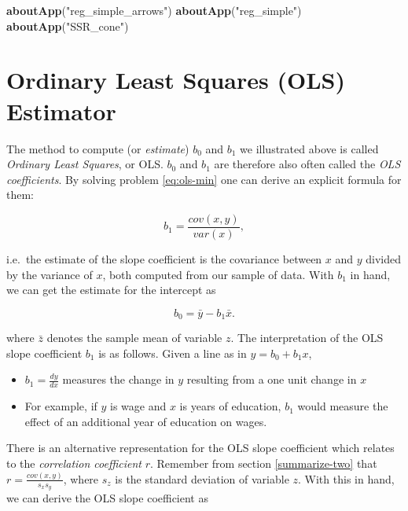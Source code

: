 \documentclass[]{book}
\newenvironment{Shaded}{\begin{snugshade}}{\end{snugshade}}
\newcommand{\KeywordTok}[1]{\textcolor[rgb]{0.13,0.29,0.53}{\textbf{#1}}}
\newcommand{\StringTok}[1]{\textcolor[rgb]{0.31,0.60,0.02}{#1}}
\newcommand{\NormalTok}[1]{#1}
\providecommand{\tightlist}{%
  \setlength{\itemsep}{0pt}\setlength{\parskip}{0pt}}
\begin{document}
\begin{Shaded}
\begin{Highlighting}[]
\KeywordTok{aboutApp}\NormalTok{(}\StringTok{"reg_simple_arrows"}\NormalTok{)}
\KeywordTok{aboutApp}\NormalTok{(}\StringTok{"reg_simple"}\NormalTok{) }
\KeywordTok{aboutApp}\NormalTok{(}\StringTok{"SSR_cone"}\NormalTok{) }
\end{Highlighting}
\end{Shaded}

\section{Ordinary Least Squares (OLS) Estimator}\label{OLS}

The method to compute (or \emph{estimate}) \(b_0\) and \(b_1\) we
illustrated above is called \emph{Ordinary Least Squares}, or OLS.
\(b_0\) and \(b_1\) are therefore also often called the \emph{OLS
coefficients}. By solving problem \eqref{eq:ols-min} one can derive an
explicit formula for them:

\begin{equation}
b_1 = \frac{cov(x,y)}{var(x)},  \label{eq:beta1hat}
\end{equation}

i.e.~the estimate of the slope coefficient is the covariance between
\(x\) and \(y\) divided by the variance of \(x\), both computed from our
sample of data. With \(b_1\) in hand, we can get the estimate for the
intercept as

\begin{equation}
b_0 = \bar{y} - b_1 \bar{x}.  \label{eq:beta0hat}
\end{equation}

where \(\bar{z}\) denotes the sample mean of variable \(z\). The
interpretation of the OLS slope coefficient \(b_1\) is as follows. Given
a line as in \(y = b_0 + b_1 x\),

\begin{itemize}
\tightlist
\item
  \(b_1 = \frac{d y}{d x}\) measures the change in \(y\) resulting from
  a one unit change in \(x\)
\item
  For example, if \(y\) is wage and \(x\) is years of education, \(b_1\)
  would measure the effect of an additional year of education on wages.
\end{itemize}

There is an alternative representation for the OLS slope coefficient
which relates to the \emph{correlation coefficient} \(r\). Remember from
section \ref{summarize-two} that \(r = \frac{cov(x,y)}{s_x s_y}\), where
\(s_z\) is the standard deviation of variable \(z\). With this in hand,
we can derive the OLS slope coefficient as
\end{document}
